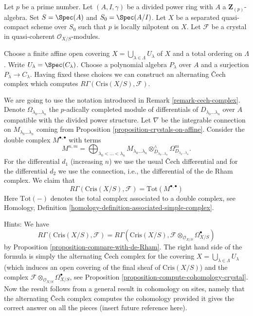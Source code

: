 \begin{remark}
\label{remark-alternating-cech-complex}
Let $p$ be a prime number. Let $(A, I, \gamma)$ be a divided power
ring with $A$ a $\mathbf{Z}_{(p)}$-algebra. Set $S = \Spec(A)$ and
$S_0 = \Spec(A/I)$. Let $X$ be a separated quasi-compact scheme
over $S_0$ such that $p$ is locally nilpotent on $X$. Let
$\mathcal{F}$ be a crystal in quasi-coherent $\mathcal{O}_{X/S}$-modules.

\medskip\noindent
Choose a finite affine open covering
$X = \bigcup_{\lambda \in \Lambda} U_\lambda$ of $X$
and a total ordering on $\Lambda$.
Write $U_\lambda = \Spec(C_\lambda)$. Choose a polynomial algebra
$P_\lambda$ over $A$ and a surjection $P_\lambda \to C_\lambda$.
Having fixed these choices we can construct an alternating
{\v C}ech complex which computes $R\Gamma(\text{Cris}(X/S), \mathcal{F})$.

\medskip\noindent
We are going to use the notation introduced in
Remark \ref{remark-cech-complex}.
Denote $\Omega_{\lambda_0 \ldots \lambda_n}$
the $p$-adically completed module of differentials of
$D_{\lambda_0 \ldots \lambda_n}$ over $A$ compatible with the divided power
structure. Let $\nabla$ be the integrable connection on
$M_{\lambda_0 \ldots \lambda_n}$ coming from
Proposition \ref{proposition-crystals-on-affine}.
Consider the double complex $M^{\bullet, \bullet}$ with
terms
$$
M^{n, m} =
\bigoplus\nolimits_{\lambda_0 < \ldots < \lambda_n}
M_{\lambda_0 \ldots \lambda_n}
\otimes^\wedge_{D_{\lambda_0 \ldots \lambda_n}}
\Omega^m_{D_{\lambda_0 \ldots \lambda_n}}.
$$
For the differential $d_1$ (increasing $n$) we use the usual
{\v C}ech differential and for the differential $d_2$ we use
the connection, i.e., the differential of the de Rham complex.
We claim that
$$
R\Gamma(\text{Cris}(X/S), \mathcal{F}) = \text{Tot}(M^{\bullet, \bullet})
$$
Here $\text{Tot}(-)$ denotes the total complex associated to a
double complex, see
Homology, Definition \ref{homology-definition-associated-simple-complex}.

\medskip\noindent
Hints: We have
$$
R\Gamma(\text{Cris}(X/S), \mathcal{F}) = R\Gamma(\text{Cris}(X/S),
\mathcal{F} \otimes_{\mathcal{O}_{X/S}} \Omega_{X/S}^\bullet)
$$
by Proposition \ref{proposition-compare-with-de-Rham}.
The right hand side of the formula is simply the alternating {\v C}ech complex
for the covering $X = \bigcup_{\lambda \in \Lambda} U_\lambda$
(which induces an open covering of the final sheaf of $\text{Cris}(X/S)$)
and the complex $\mathcal{F} \otimes_{\mathcal{O}_{X/S}} \Omega_{X/S}^\bullet$,
see Proposition \ref{proposition-compute-cohomology-crystal}.
Now the result follows from a general result in cohomology on sites,
namely that the alternating {\v C}ech complex computes the cohomology
provided it gives the correct answer on all the pieces (insert future
reference here).
\end{remark}

